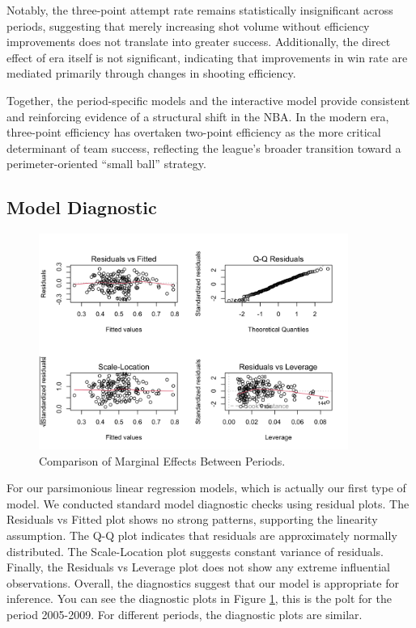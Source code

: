\documentclass[11pt, a4paper]{article} %
\begin{document}
Notably, the three-point attempt rate remains statistically insignificant across periods, suggesting that merely increasing shot volume 
without efficiency improvements does not translate into greater success. Additionally, the direct effect of era itself is not significant, 
indicating that improvements in win rate are mediated primarily through changes in shooting efficiency.

Together, the period-specific models and the interactive model provide consistent and reinforcing evidence of a structural shift in the NBA. 
In the modern era, three-point efficiency has overtaken two-point efficiency as the more critical determinant of team success, reflecting 
the league’s broader transition toward a perimeter-oriented ``small ball'' strategy.


\subsection{Model Diagnostic}
\begin{figure}[htbp]
    \centering
    \includegraphics[width=0.9\textwidth]{figure/diagnostic_plots_mydf_2005_2009.png}
    \caption{Comparison of Marginal Effects Between Periods.}
    \label{fig:diagnostic_plots}
\end{figure}
For our parsimonious linear regression models, which is actually our first type of model. We conducted standard model diagnostic checks using residual 
plots. The Residuals vs Fitted plot shows no strong patterns, supporting the linearity assumption. The Q-Q plot indicates that residuals are 
approximately normally distributed. The Scale-Location plot suggests constant variance of residuals. Finally, the Residuals vs Leverage plot does not 
show any extreme influential observations. Overall, the diagnostics suggest that our model is appropriate for inference. You can see the diagnostic plots 
in Figure \ref{fig:diagnostic_plots}, this is the polt for the period 2005-2009. For different periods, the diagnostic plots are similar.
\end{document}
